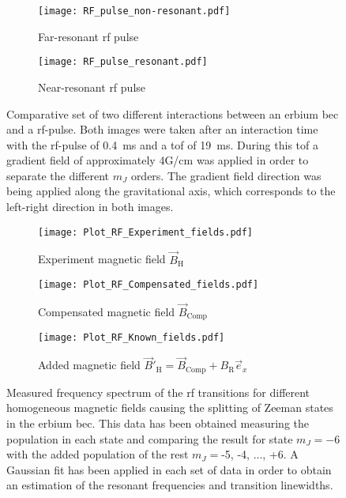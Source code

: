 \begin{figure}[!htbp]
	\centering
	\begin{subfigure}{.5\textwidth}
		\centering
		\texttt{[image: RF\_pulse\_non-resonant.pdf]}
		\caption{Far-resonant \ac{rf} pulse}
		\label{fig:RF_pulse_non-resonant}
	\end{subfigure}%
	\begin{subfigure}{.5\textwidth}
		\centering
		\texttt{[image: RF\_pulse\_resonant.pdf]}
		\caption{Near-resonant \ac{rf} pulse}
		\label{fig:RF_pulse_resonant}
	\end{subfigure}
	\caption[Comparative set of two different interactions between an erbium \ac{bec} and a \ac{rf}-pulse.]{Comparative set of two different interactions between an erbium \ac{bec} and a \ac{rf}-pulse. Both images were taken after an interaction time with the \ac{rf}-pulse of \SI{0.4}{\milli\second} and a \ac{tof} of \SI{19}{\milli\second}. During this \acl{tof} a gradient field of approximately 4G/cm was applied in order to separate the different $m_J$ orders. The gradient field direction was being applied along the gravitational axis, which corresponds to the left-right direction in both images.}
	\label{fig:RF_pulse}
\end{figure}



\begin{figure}[!htbp]
	\centering
	\begin{subfigure}{1.\textwidth}
		\centering
		\label{fig:Plot_RF_Experiment_fields}
		\texttt{[image: Plot\_RF\_Experiment\_fields.pdf]}
		\caption{Experiment magnetic field $\vec{B}_\text{H}$}
	\end{subfigure}%
	\hfill
	\begin{subfigure}{1.\textwidth}
		\centering
		\label{fig:Plot_RF_Compensated_fields}
		\texttt{[image: Plot\_RF\_Compensated\_fields.pdf]}
		\caption{Compensated magnetic field $\vec{B}_\text{Comp}$}
	\end{subfigure}
	\hfill
	\begin{subfigure}{1.\textwidth}
		\centering
		\label{fig:Plot_RF_Known_fields}
		\texttt{[image: Plot\_RF\_Known\_fields.pdf]}
		\caption{Added magnetic field $\vec{B}'_\text{H} = \vec{B}_\text{Comp} +B_\text{R}\vec{e}_x$}
	\end{subfigure}
	\caption[Measured frequency spectrum of the \ac{rf} transitions for different homogeneous magnetic fields causing the splitting of Zeeman states in the erbium \ac{bec}]{Measured frequency spectrum of the \ac{rf} transitions for different homogeneous magnetic fields causing the splitting of Zeeman states in the erbium \ac{bec}. This data has been obtained measuring the population in each state and comparing the result for state $m_J = -6$ with the added population of the rest $m_J = $-5, -4, ..., +6. A Gaussian fit has been applied in each set of data in order to obtain an estimation of the resonant frequencies and transition linewidths.}
	\label{fig:Plot_RF_All_fields}
\end{figure}

